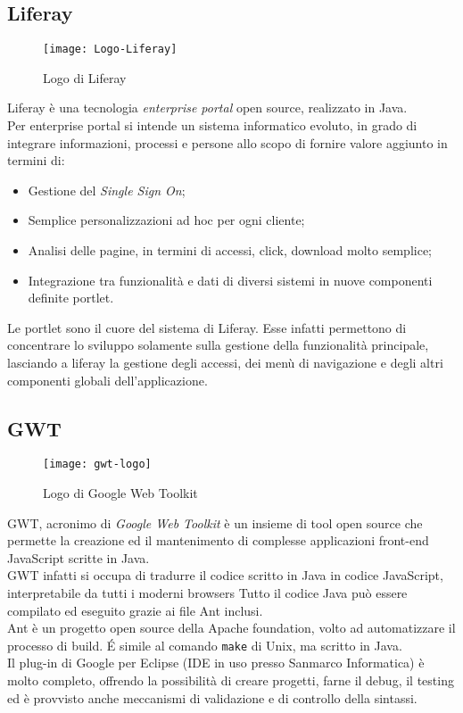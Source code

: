 \subsection{Liferay}
\begin{figure}[h]
	\centering
	\texttt{[image: Logo-Liferay]}
	\caption{Logo di Liferay}
\end{figure}
Liferay è una tecnologia \emph{enterprise portal} open source, realizzato in Java.\\
Per enterprise portal si intende un sistema informatico evoluto, in grado di integrare informazioni, processi e persone allo scopo di fornire valore aggiunto in termini di:
\begin{itemize}
	\item Gestione del \emph{Single Sign On};
	\item Semplice personalizzazioni ad hoc per ogni cliente;
	\item Analisi delle pagine, in termini di accessi, click, download molto semplice;
	\item Integrazione tra funzionalità e dati di diversi sistemi in nuove componenti definite \gls{portlet}\glsfirstoccur. 
\end{itemize}
Le \gls{portlet} sono il cuore del sistema di Liferay. Esse infatti permettono di concentrare lo sviluppo solamente sulla gestione della funzionalità principale, lasciando a liferay la gestione degli accessi, dei menù di navigazione e degli altri componenti globali dell'applicazione.\\
\subsection{GWT}
\begin{figure}[h]
	\centering
	\texttt{[image: gwt-logo]}
	\caption{Logo di Google Web Toolkit}
\end{figure} 
GWT, acronimo di \emph{Google Web Toolkit} è un insieme di tool open source che permette la creazione ed il mantenimento di complesse applicazioni front-end JavaScript scritte in Java.\\
GWT infatti si occupa di tradurre il codice scritto in Java in codice JavaScript, interpretabile da tutti i moderni browsers Tutto il codice Java può essere compilato ed eseguito grazie ai file Ant inclusi.\\
Ant è un progetto open source della Apache foundation, volto ad automatizzare il processo di build. \'E simile al comando \lstinline[language=C]|make| di Unix, ma scritto in Java. \\ %
Il plug-in di Google per Eclipse (IDE in uso presso Sanmarco Informatica) è molto completo, offrendo la possibilità di creare progetti, farne il debug, il testing ed è provvisto anche meccanismi di validazione e di controllo della sintassi.\\
